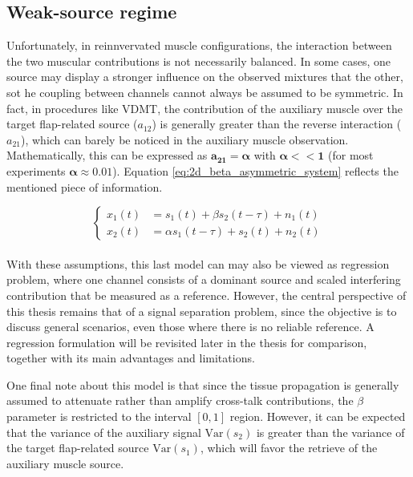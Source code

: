 \subsection{Weak-source regime}
\label{sec:weak_source_regime}

Unfortunately, in reinnvervated muscle configurations, the interaction between the two muscular contributions is not necessarily balanced. In some cases, one source may display a stronger influence on the observed mixtures that the other, sot he coupling between channels cannot always be assumed to be symmetric. In fact, in procedures like VDMT, the contribution of the auxiliary muscle over the target flap-related source ($a_{12}$) is generally greater than the reverse interaction ($a_{21}$), which can barely be noticed in the auxiliary muscle observation. Mathematically, this can be expressed as $\mathbf{a_{21}=\alpha}$ with $\mathbf{\alpha<<1}$  (for most experiments $\mathbf{\alpha \approx0.01}$). Equation \ref{eq:2d_beta_asymmetric_system} reflects the mentioned piece of information.

\begin{equation}
\left\{
\begin{aligned}
x_1(t) &= s_1(t) + \beta s_2(t-\tau) + n_1(t) \\
x_2(t) &= \alpha s_1(t-\tau) + s_2(t) + n_2(t) 
\end{aligned}
\right.
\label{eq:2d_beta_asymmetric_system}
\end{equation}
\\
With these assumptions, this last model can may also be viewed as regression problem, where one channel consists of a dominant source and scaled interfering contribution that be measured as a reference. However, the central perspective of this thesis remains that of a signal separation problem, since the objective is to discuss general scenarios, even those where there is no reliable reference. A regression formulation will  be revisited later in the thesis for comparison, together with its main advantages and limitations.

One final note about this model is that since the tissue propagation is generally assumed to attenuate rather than amplify cross-talk contributions, the $\beta$ parameter is restricted to the interval $[0,1]$ region. However, it can be expected that the variance of the auxiliary signal $\mathrm{Var}(s_2)$ is greater than the variance of the target flap-related source $\mathrm{Var}(s_1)$, which will favor the retrieve of the auxiliary muscle source.  

